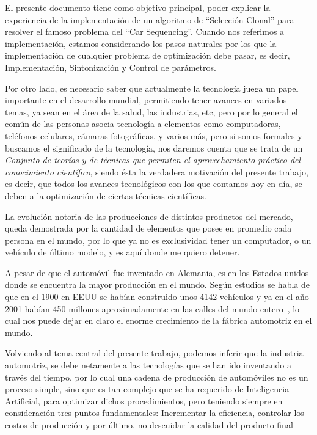 El presente documento tiene como objetivo principal,
poder explicar la experiencia de la implementación de un algoritmo
de ``Selección Clonal'' para resolver el famoso problema del ``Car Sequencing''.
Cuando nos referimos a implementación, estamos considerando los pasos naturales
por los que la implementación de cualquier problema de optimización debe pasar,
es decir, Implementación, Sintonización y Control de parámetros.

Por otro lado, es necesario saber que actualmente la tecnología juega un papel importante en el desarrollo mundial,
permitiendo tener avances en variados temas, ya sean en el área de la salud,
las industrias, etc, pero por lo general el común de las personas asocia
tecnología a elementos como computadoras, teléfonos celulares, cámaras fotográficas,
y varios más, pero si somos formales y buscamos el significado de la tecnología,
nos daremos cuenta que se trata de un \emph{Conjunto de teorías y de técnicas que permiten
el aprovechamiento práctico del conocimiento científico}, siendo ésta la verdadera
motivación del presente trabajo, es decir, que todos los avances tecnológicos
con los que contamos hoy en día, se deben a la optimización de ciertas técnicas científicas.

La evolución notoria de las producciones de distintos productos del mercado, queda demostrada
por la cantidad de elementos que posee en promedio cada persona en el mundo, por lo que ya no es
exclusividad tener un computador, o un vehículo de último modelo, y es aquí donde me quiero detener.

A pesar de que el automóvil fue inventado en Alemania, es en los Estados unidos donde se encuentra
la mayor producción en el mundo. Según estudios se habla de que en el 1900 en EEUU se habían
construido unos 4142 vehículos y ya en el año 2001 habían 450 millones aproximadamente en las calles
del mundo entero~\cite{stasenko}, lo cual nos puede dejar en claro el enorme crecimiento de la fábrica automotriz en
el mundo.

Volviendo al tema central del presente trabajo, podemos inferir que la industria automotriz,
se debe netamente a las tecnologías que se han ido inventando a través del tiempo, por lo cual
una cadena de producción de automóviles no es un proceso simple, sino que es tan complejo
que se ha requerido de Inteligencia Artificial, para optimizar dichos procedimientos,
pero teniendo siempre en consideración tres puntos fundamentales: Incrementar la eficiencia,
controlar los costos de producción y por último, no descuidar la calidad del producto final

